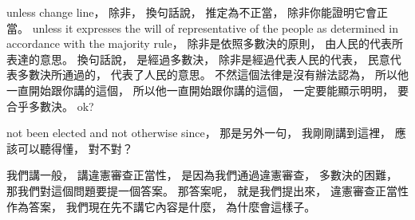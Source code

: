 \hypertarget{w02:cue:426}{}unless change line，
\hypertarget{w02:cue:427}{}除非，
\hypertarget{w02:cue:428}{}換句話說，
\hypertarget{w02:cue:429}{}推定為不正當，
\hypertarget{w02:cue:430}{}除非你能證明它會正當。
\hypertarget{w02:cue:431}{}unless it expresses the will of representative of the people
\hypertarget{w02:cue:432}{}as determined in accordance with the majority rule，
\hypertarget{w02:cue:433}{}除非是依照多數決的原則，
\hypertarget{w02:cue:434}{}由人民的代表所表達的意思。
\hypertarget{w02:cue:435}{}換句話說，
\hypertarget{w02:cue:436}{}是經過多數決，
\hypertarget{w02:cue:437}{}除非是經過代表人民的代表，
\hypertarget{w02:cue:438}{}民意代表多數決所通過的，
\hypertarget{w02:cue:439}{}代表了人民的意思。
\hypertarget{w02:cue:440}{}不然這個法律是沒有辦法認為，
\hypertarget{w02:cue:441}{}所以他一直開始跟你講的這個，
\hypertarget{w02:cue:442}{}所以他一直開始跟你講的這個，
\hypertarget{w02:cue:443}{}一定要能顯示明明，
\hypertarget{w02:cue:444}{}要合乎多數決。
\hypertarget{w02:cue:445}{}ok?

\hypertarget{w02:cue:446}{}not been elected
\hypertarget{w02:cue:447}{}and not otherwise
\hypertarget{w02:cue:448}{}since，
\hypertarget{w02:cue:449}{}那是另外一句，
\hypertarget{w02:cue:450}{}我剛剛講到這裡，
\hypertarget{w02:cue:451}{}應該可以聽得懂，
\hypertarget{w02:cue:452}{}對不對？

\hypertarget{w02:cue:453}{}我們講一般，
\hypertarget{w02:cue:454}{}講違憲審查正當性，
\hypertarget{w02:cue:455}{}是因為我們通過違憲審查，
\hypertarget{w02:cue:456}{}多數決的困難，
\hypertarget{w02:cue:457}{}那我們對這個問題要提一個答案。
\hypertarget{w02:cue:458}{}那答案呢，
\hypertarget{w02:cue:459}{}就是我們提出來，
\hypertarget{w02:cue:460}{}違憲審查正當性作為答案，
\hypertarget{w02:cue:461}{}我們現在先不講它內容是什麼，
\hypertarget{w02:cue:462}{}為什麼會這樣子。


